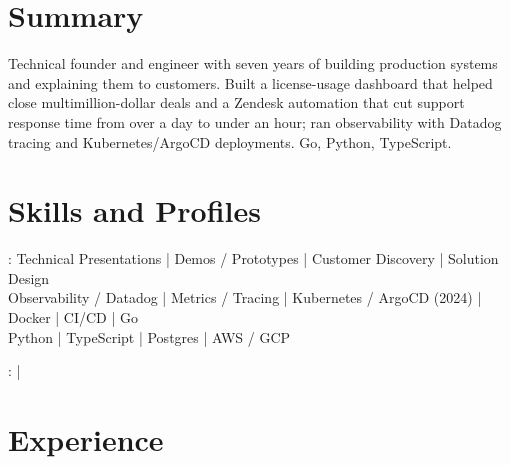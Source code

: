 \documentclass[print]{jack-resume}
\begin{document}
\pagecolor{darkmodeBackground}


\begin{minipage}[t][1cm][t]{.03\textwidth}
    \hfill
\end{minipage}

\section{Summary}
Technical founder and engineer with seven years of building production systems and explaining them to customers. Built a license-usage dashboard that helped close multimillion-dollar deals and a Zendesk automation that cut support response time from over a day to under an hour; ran observability with Datadog tracing and Kubernetes/ArgoCD deployments. Go, Python, TypeScript.
\sectionsep

\section{Skills and Profiles}
:
Technical Presentations \hfill | \hfill
Demos / Prototypes \hfill | \hfill
Customer Discovery \hfill | \hfill
Solution Design \\
\hspace{1.0cm} Observability / Datadog \hfill | \hfill
Metrics / Tracing \hfill | \hfill
Kubernetes / ArgoCD (2024) \hfill | \hfill
Docker \hfill | \hfill
CI/CD \hfill | \hfill
Go \\
\hspace{1.0cm} Python \hfill | \hfill
TypeScript \hfill | \hfill
Postgres \hfill | \hfill
AWS / GCP \\

\raggedright{
    :
      \href{https://www.linkedin.com/in/jack-sturtevant/}{ \ExternalLink} |
     \href{https://github.com/jacksturt}{ \ExternalLink}}

\section{Experience}
\end{document}
